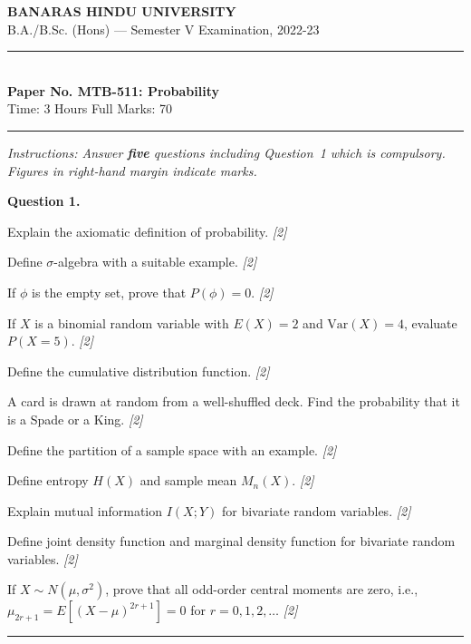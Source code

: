 \documentclass[11pt,a4paper]{article}
\newcommand{\pts}[1]{\hfill   \textit{[#1]}}
\begin{document}
\begin{center}
  {\large\bfseries BANARAS HINDU UNIVERSITY}\\[2pt]
  {\normalsize B.A./B.Sc. (Hons) --- Semester V Examination, 2022-23}\\[6pt]
  \rule{0.8\linewidth}{0.5pt}\\[6pt]
  {\large\bfseries Paper No. MTB-511: Probability}\\[4pt]
  {\normalsize Time: 3 Hours \hfill Full Marks: 70}
\end{center}
\rule{\linewidth}{0.4pt}
\smallskip



\noindent   \textit{Instructions: Answer   \textbf{five} questions including Question~1 which is compulsory. Figures in right-hand margin indicate marks.}
\bigskip




\noindent   \textbf{Question 1.}

\begin{parts}
  \item Explain the axiomatic definition of probability. \pts{2}
  \item Define $\sigma$-algebra with a suitable example. \pts{2}
  \item If $\phi$ is the empty set, prove that $P(\phi) = 0$. \pts{2}
  \item If $X$ is a binomial random variable with $E(X) = 2$ and $ \text{Var}(X) = 4$, evaluate $P(X = 5)$. \pts{2}
  \item Define the cumulative distribution function. \pts{2}
  \item A card is drawn at random from a well-shuffled deck. Find the probability that it is a Spade or a King. \pts{2}
  \item Define the partition of a sample space with an example. \pts{2}
  \item Define entropy $H(X)$ and sample mean $M_n(X)$. \pts{2}
  \item Explain mutual information $I(X;Y)$ for bivariate random variables. \pts{2}
  \item Define joint density function and marginal density function for bivariate random variables. \pts{2}
  \item If $X \sim N(\mu, \sigma^2)$, prove that all odd-order central moments are zero, i.e., $\mu_{2r+1} = E[(X-\mu)^{2r+1}] = 0$ for $r = 0, 1, 2, \dots$ \pts{2}
\end{parts}

\medskip\rule{\linewidth}{0.2pt}
\end{document}
